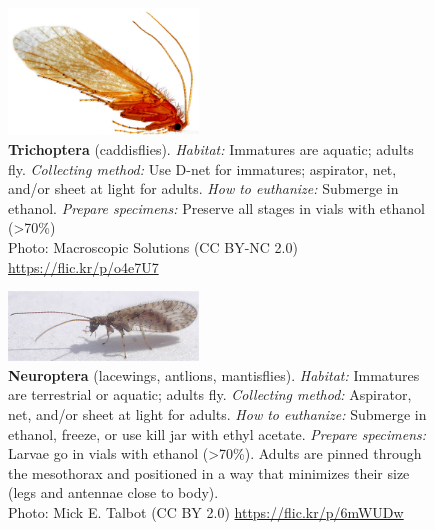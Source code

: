 \documentclass[letterpaper, 11pt]{article}
\begin{document}
\begin{figure}
  \caption{\textbf{Trichoptera} (caddisflies). \textit{Habitat:} Immatures are aquatic; adults fly. \textit{Collecting method:} Use D-net for immatures; aspirator, net, and/or sheet at light for adults. \textit{How to euthanize:} Submerge in ethanol. \textit{Prepare specimens:} Preserve all stages in vials with ethanol (\textgreater70\%)\\ Photo: Macroscopic Solutions (CC BY-NC 2.0) \url{https://flic.kr/p/o4e7U7}}
  \includegraphics[width=0.45\textwidth]{Trichoptera}
\end{figure}

\clearpage

\begin{figure}
  \caption{\textbf{Neuroptera} (lacewings, antlions, mantisflies).
  \textit{Habitat:} Immatures are terrestrial or aquatic; adults fly. \textit{Collecting method:} Aspirator, net, and/or sheet at light for adults. \textit{How to euthanize:} Submerge in ethanol, freeze, or use kill jar with ethyl acetate. \textit{Prepare specimens:} Larvae go in vials with ethanol (\textgreater70\%). Adults are pinned through the mesothorax and positioned in a way that minimizes their size (legs and antennae close to body).\\ Photo: Mick E. Talbot (CC BY 2.0) \url{https://flic.kr/p/6mWUDw}}
  \includegraphics[width=0.45\textwidth]{Neuroptera}
\end{figure}
\end{document}
